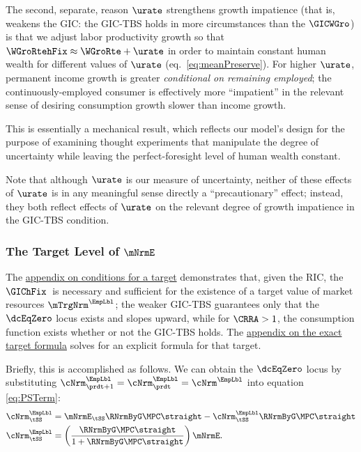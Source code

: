 \documentclass{econark}
\begin{document}
The second, separate, reason $\urate$ strengthens growth impatience (that is, weakens the GIC: the GIC-TBS holds in more circumstances than the $\GICWGro$) is that we adjust labor productivity growth so that $\WGroRtehFix\approx\WGroRte+\urate$ in 
order to maintain constant human wealth for different values of
$\urate$ (eq.\ \eqref{eq:meanPreserve}).  For higher
$\urate$, permanent income growth is greater {\it conditional on
  remaining employed}; the continuously-employed consumer is effectively
more ``impatient'' in the relevant sense of desiring consumption growth
slower than income growth.

This is essentially a mechanical result, which reflects our model's
design for the purpose of examining thought experiments that
manipulate the degree of uncertainty while leaving the
perfect-foresight level of human wealth constant.  

Note that although $\urate$ is our measure of uncertainty, neither of 
these effects of $\urate$ is in any meaningful sense directly a 
``precautionary'' effect; instead, they both reflect effects of 
$\urate$ on the relevant degree of growth impatience in the GIC-TBS 
condition.  

\subsubsection{The Target Level of $\mNrmE$}

The \hyperref[sec:mTargExists]{appendix on conditions for a target} demonstrates that, given the RIC, the $\GIChFix$~is necessary and sufficient for the existence of a target value of market resources $\mTrgNrm^{\EmpLbl}$; the weaker GIC-TBS guarantees only that the $\dcEqZero$ locus exists and slopes upward, while for $\CRRA > 1$, the consumption function exists whether or not the GIC-TBS holds.   The \hyperref[sec:mTargExact]{appendix on the exact target formula} solves for an explicit formula for that target.

Briefly, this is accomplished as follows.  We can obtain the $\dcEqZero$ locus by substituting
${\cNrm}^{\EmpLbl}_{\prdt+1}={\cNrm}^{\EmpLbl}_{\prdt}={\cNrm}^{\EmpLbl}$ into equation \eqref{eq:PSTerm}:
\begin{equation}\begin{gathered}\begin{aligned}
  {\cNrm}^{\EmpLbl}_{\tSS} & =  \mNrmE_{\tSS} \RNrmByG\MPC\straight - {\cNrm}^{\EmpLbl}_{\tSS} \RNrmByG\MPC\straight
\\  {\cNrm}^{\EmpLbl}_{\tSS} & =  \left(\frac{\RNrmByG\MPC\straight}{1+\RNrmByG\MPC\straight}\right)\mNrmE.
  \label{eq:cDelEqZero} %
\end{aligned}\end{gathered}\end{equation}
\end{document}
